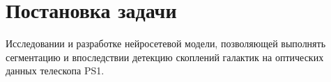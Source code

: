 \chapter{Постановка задачи}
\label{cha:ch_1}

Исследовании и разработке нейросетевой модели, позволяющей выполнять сегментацию и впоследствии 
детекцию скоплений галактик на оптических данных телескопа PS1.\\

